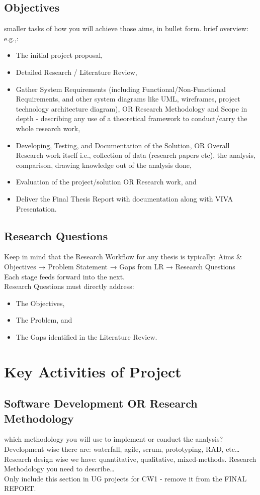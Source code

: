 \subsection{Objectives}
smaller tasks of how you will achieve those aims, in bullet form.
brief overview: e.g.,:
\begin{itemize}
    \item The initial project proposal,
    \item Detailed Research / Literature Review,
    \item Gather System Requirements (including Functional/Non-Functional Requirements, and other system diagrams like UML, wireframes, project technology architecture diagram), OR Research Methodology and Scope in depth - describing any use of a theoretical framework to conduct/carry the whole research work,
    \item Developing, Testing, and Documentation of the Solution, OR Overall Research work itself i.e., collection of data (research papers etc), the analysis, comparison, drawing knowledge out of the analysis done,
    \item Evaluation of the project/solution OR Research work, and
    \item Deliver the Final Thesis Report with documentation along with VIVA Presentation.
\end{itemize}

\subsection{Research Questions}
Keep in mind that the Research Workflow for any thesis is typically: Aims \& Objectives → Problem Statement → Gaps from LR → Research Questions\\
Each stage feeds forward into the next.\\
Research Questions must directly address:
\begin{itemize}
    \item The Objectives,
    \item The Problem, and
    \item The Gaps identified in the Literature Review.
\end{itemize}

\section{Key Activities of Project}
\subsection{Software Development OR Research Methodology}
which methodology you will use to implement or conduct the analysis?  \\
Development wise there are: waterfall, agile, scrum, prototyping, RAD, etc\ldots \\
Research design wise we have: quantitative, qualitative, mixed-methods. Research Methodology you need to describe\ldots\\
Only include this section in UG projects for CW1 - remove it from the FINAL REPORT.\\

